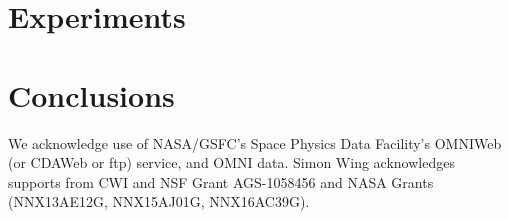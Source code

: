 \documentclass[sw, draft]{AGUTeX}
\begin{document}
\begin{article}
\section{Experiments}\label{sec:exp}



\section{Conclusions}\label{sec:res}


%
%
%
%
%

%

\begin{acknowledgments}
We acknowledge use of NASA/GSFC's Space Physics Data Facility's OMNIWeb (or CDAWeb or ftp) service, and OMNI data. Simon Wing acknowledges supports from CWI and NSF Grant AGS-1058456 and NASA Grants (NNX13AE12G, NNX15AJ01G, NNX16AC39G).
\end{acknowledgments}

%
%
%
%
%
%
%
%
%




\end{article}
\end{document}
